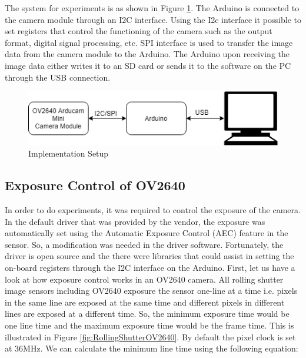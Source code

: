 The system for experiments is as shown in Figure \ref{fig:imp_setup}. The Arduino is connected to the camera module through an I2C interface. Using the I2c interface it possible to set registers that control the functioning of the camera such as the output format, digital signal processing, etc. SPI interface is used to transfer the image data from the camera module to the Arduino. The Arduino upon receiving the image data either writes it to an  SD card or sends it to the software on the PC through the USB connection. 
\begin{figure}[!htbp]
\centering
\includegraphics[scale=0.75]{pics/implementation_setup}
\caption{Implementation Setup}
\label{fig:imp_setup}
\end{figure}


\subsection{Exposure Control of OV2640}
In order to do experiments, it was required to control the exposure of the camera. In the default driver that was provided by the vendor, the exposure was automatically set using the Automatic Exposure Control (AEC) feature in the sensor. So, a modification was needed in the driver software. Fortunately, the driver is open source and the there were libraries that could assist in setting the on-board registers through the I2C interface on the Arduino. First, let us have a look at how exposure control works in an OV2640 camera. All rolling shutter image sensors including OV2640 exposure the sensor one-line at a time i.e. pixels in the same line are exposed at the same time and different pixels in different lines are exposed at a different time. So, the minimum exposure time would be one line time and the maximum exposure time would be the frame time. This is illustrated in Figure \ref{fig:RollingShutterOV2640}. By default the pixel clock is set at 36MHz. We can calculate the minimum line time using the following equation:

